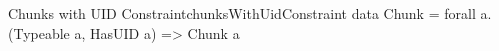 \begin{pseudohaskell}{Chunks with UID Constraint}{chunksWithUidConstraint}
data Chunk = forall a. (Typeable a, HasUID a) => Chunk a
\end{pseudohaskell}
    